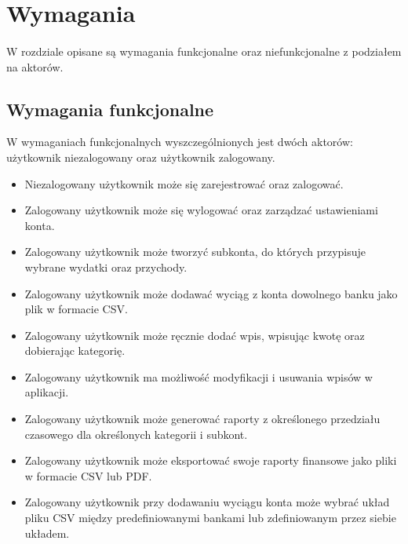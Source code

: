 \documentclass{article}
\begin{document}
	\section{Wymagania}
	\paragraph{} W rozdziale opisane są wymagania funkcjonalne oraz niefunkcjonalne z podziałem na aktorów.
	\subsection{Wymagania funkcjonalne}
	W wymaganiach funkcjonalnych wyszczególnionych jest dwóch aktorów: użytkownik niezalogowany oraz użytkownik zalogowany.
	\begin{itemize}
		\item Niezalogowany użytkownik może się zarejestrować oraz zalogować.
		\item Zalogowany użytkownik może się wylogować oraz zarządzać ustawieniami konta.
		\item Zalogowany użytkownik może tworzyć subkonta, do których przypisuje wybrane wydatki oraz przychody.
		\item Zalogowany użytkownik może dodawać wyciąg z konta dowolnego banku jako plik w formacie CSV.
		\item Zalogowany użytkownik może ręcznie dodać wpis, wpisując kwotę oraz dobierając kategorię.
		\item Zalogowany użytkownik ma możliwość modyfikacji i usuwania wpisów w aplikacji.
		\item Zalogowany użytkownik może generować raporty z określonego przedziału czasowego dla określonych kategorii i subkont.
		\item Zalogowany użytkownik może eksportować swoje raporty finansowe jako pliki w formacie CSV lub PDF.
		\item Zalogowany użytkownik przy dodawaniu wyciągu konta może wybrać układ pliku CSV między predefiniowanymi bankami lub zdefiniowanym przez siebie układem.
		
	\end{itemize}
\end{document}
